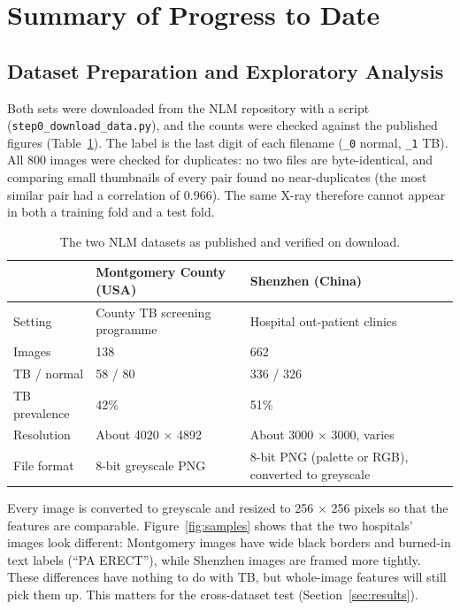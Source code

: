 \documentclass[11pt,a4paper]{article}
\begin{document}
\section{Summary of Progress to Date}
\subsection{Dataset Preparation and Exploratory Analysis}
Both sets were downloaded from the NLM repository with a script (\texttt{step0\_download\_data.py}), and the counts were checked against the published figures (Table~\ref{tab:data}). The label is the last digit of each filename (\texttt{\_0} normal, \texttt{\_1} TB). All 800 images were checked for duplicates: no two files are byte-identical, and comparing small thumbnails of every pair found no near-duplicates (the most similar pair had a correlation of 0.966). The same X-ray therefore cannot appear in both a training fold and a test fold.

\begin{table}[htbp]
  \centering
  \caption{The two NLM datasets as published and verified on download.}
  \label{tab:data}
  \footnotesize
  \begin{tabularx}{\linewidth}{l X X}
    \toprule
    \textbf{} & \textbf{Montgomery County (USA)} & \textbf{Shenzhen (China)} \\
    \midrule
    Setting & County TB screening programme & Hospital out-patient clinics \\
    Images & 138 & 662 \\
    TB / normal & 58 / 80 & 336 / 326 \\
    TB prevalence & 42\% & 51\% \\
    Resolution & About 4020 $\times$ 4892 & About 3000 $\times$ 3000, varies \\
    File format & 8-bit greyscale PNG & 8-bit PNG (palette or RGB), converted to greyscale \\
    \bottomrule
  \end{tabularx}
\end{table}

Every image is converted to greyscale and resized to 256 $\times$ 256 pixels so that the features are comparable. Figure~\ref{fig:samples} shows that the two hospitals' images look different: Montgomery images have wide black borders and burned-in text labels (``PA ERECT''), while Shenzhen images are framed more tightly. These differences have nothing to do with TB, but whole-image features will still pick them up. This matters for the cross-dataset test (Section~\ref{sec:results}).
\end{document}
